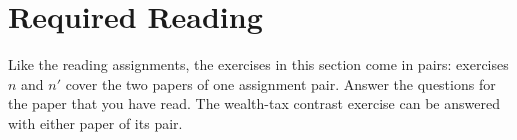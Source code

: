 
\section{Required Reading}

\newcommand{\primedquestion}{\addtocounter{question}{-1}\renewcommand{\thequestion}{\arabic{question}$'$}}
\newcommand{\unprimedquestion}{\renewcommand{\thequestion}{\arabic{question}}}

Like the reading assignments, the exercises in this section come in pairs:
exercises $n$ and $n'$ cover the two papers of one assignment pair. Answer the
questions for the paper that you have read. The wealth-tax contrast exercise can
be answered with either paper of its pair.


\primedquestion

\unprimedquestion

\primedquestion

\unprimedquestion


\primedquestion

\unprimedquestion

\primedquestion

\unprimedquestion
